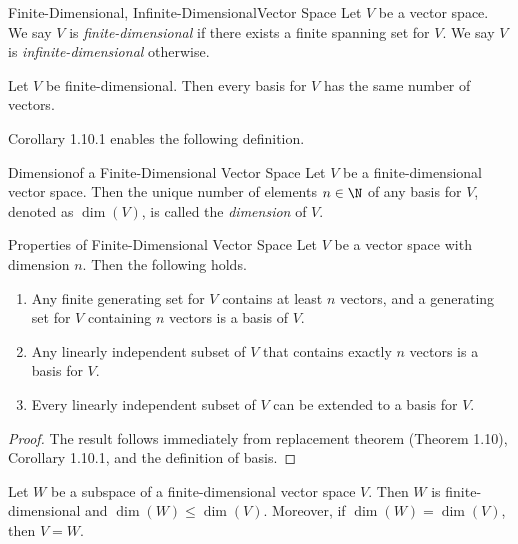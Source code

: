 \documentclass[linearalgebra]{subfiles}
\begin{document}
    \begin{definition}{Finite-Dimensional, Infinite-Dimensional}{Vector Space}
        Let $V$ be a vector space. We say $V$ is \emph{finite-dimensional} if there exists a finite spanning set for $V$. We say $V$ is \emph{infinite-dimensional} otherwise.
    \end{definition}

    \begin{cor}{}
        Let $V$ be finite-dimensional. Then every basis for $V$ has the same number of vectors.
    \end{cor}	

    \begin{remark}
        Corollary 1.10.1 enables the following definition.
    \end{remark}

    \begin{definition}{Dimension}{of a Finite-Dimensional Vector Space}
        Let $V$ be a finite-dimensional vector space. Then the unique number of elements $n\in\N$ of any basis for $V$, denoted as $\dim(V)$, is called the \emph{dimension} of $V$.
    \end{definition}

    \begin{prop}{Properties of Finite-Dimensional Vector Space}
        Let $V$ be a vector space with dimension $n$. Then the following holds.
        \begin{enumerate}
            \item Any finite generating set for $V$ contains at least $n$ vectors, and a generating set for $V$ containing $n$ vectors is a basis of $V$.
            \item Any linearly independent subset of $V$ that contains exactly $n$ vectors is a basis for $V$.
            \item Every linearly independent subset of $V$ can be extended to a basis for $V$.
        \end{enumerate}
    \end{prop}

    \begin{proof}
        The result follows immediately from replacement theorem (Theorem 1.10), Corollary 1.10.1, and the definition of basis.
    \end{proof}

    \begin{prop}{}
        Let $W$ be a subspace of a finite-dimensional vector space $V$. Then $W$ is finite-dimensional and $\dim(W)\leq \dim(V)$. Moreover, if $\dim(W) = \dim(V)$, then $V=W$.
    \end{prop}
\end{document}
